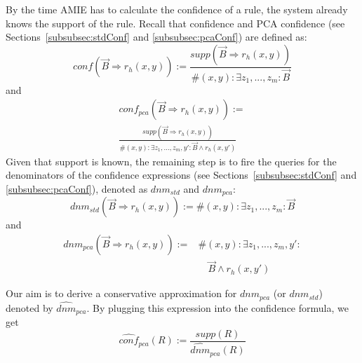 By the time AMIE has to calculate the confidence of a rule, the system already knows the support of the rule.
Recall that confidence and PCA confidence (see Sections~\ref{subsubsec:stdConf} and \ref{subsubsec:pcaConf}) are defined as:
\[conf(\vec{B} \Rightarrow r_h(x,y)) := \frac{supp(\vec{B} \Rightarrow r_h(x,y))}{\#(x,y): \exists z_1,...,z_m: \vec{B}}\]
and
\begin{multline*}
conf_{pca}(\vec{B} \Rightarrow r_h(x,y)) :=\\
\frac{supp(\vec{B} \Rightarrow r_h(x,y))}{\#(x,y): \exists z_1,...,z_m,y': \vec{B} \wedge r_h(x,y')}
\end{multline*}
\noindent Given that support is known, the remaining step is to fire the queries for the denominators of the confidence expressions
(see Sections~\ref{subsubsec:stdConf} and \ref{subsubsec:pcaConf}), denoted as $dnm_{std}$ and $dnm_{pca}$:
\begin{equation} \label{eq:denomStandardConf}
 dnm_{std}(\vec{B} \Rightarrow r_h(x,y)):= \#(x,y): \exists z_1,...,z_m: \vec{B}
\end{equation}
and
\begin{equation} \label{eq:denomPCA}
\begin{array}{rl}
dnm_{pca}(\vec{B} \Rightarrow r_h(x,y)) := {}& \#(x,y): \exists z_1,...,z_m,y': \\ &\quad \vec{B} \wedge r_h(x,y')
\end{array}
\end{equation}



Our aim is to derive a conservative approximation for $dnm_{pca}$ (or $dnm_{std}$) denoted by
$\widehat{dnm}_{pca}$. By plugging this expression into the confidence formula, we get
\begin{equation} \label{eq:pcaApproxConf}
  \widehat{conf}_{pca}(R):=\frac{supp(R)}{\widehat{dnm}_{pca}(R)}
\end{equation}

